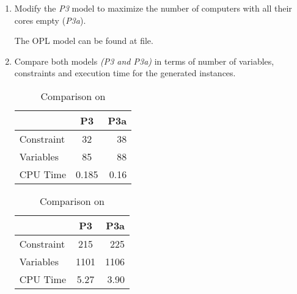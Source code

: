 \documentclass[12pt, a4paper]{article}
\begin{document}
\begin{enumerate}[label=(\alph*)]
    \item Modify the \textit{P3} model to maximize the number of computers with all their cores empty (\textit{P3a}).

    The OPL model can be found at  file.

    \newpage

    \item Compare both models \textit{(P3 and P3a)} in terms of number of variables, constraints and execution time for the generated instances.

    \begin{table}[H]
      \begin{center}
        \begin{tabular}{l | c r}
          & P3 & P3a \\
          \hline
          Constraint & 32 & 38 \\
          Variables & 85 & 88 \\
          CPU Time & 0.185 & 0.16 \\
        \end{tabular}
      \end{center}
      \caption{Comparison on }
    \end{table}

    \begin{table}[H]
      \begin{center}
        \begin{tabular}{l | c r}
          & P3 & P3a \\
          \hline
          Constraint &  215 & 225 \\
          Variables & 1101 & 1106 \\
          CPU Time & 5.27 & 3.90 \\
        \end{tabular}
      \end{center}
      \caption{Comparison on }
    \end{table}

\end{enumerate}
\end{document}
